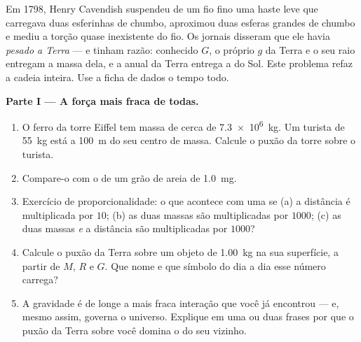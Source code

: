 \begin{problem}
\label{pb:g10:universal-gravitation:1}
Em 1798, Henry Cavendish suspendeu de um fio fino uma haste leve que
carregava duas esferinhas de chumbo, aproximou duas esferas grandes de
chumbo e mediu a torção quase inexistente do fio. Os jornais disseram que
ele havia \emph{pesado a Terra} --- e tinham razão: conhecido $G$, o
próprio $g$ da Terra e o seu raio entregam a massa dela, e a  anual
da Terra entrega a do Sol. Este problema refaz a cadeia inteira. Use a
ficha de dados o tempo todo.

\medskip
\noindent\textbf{Parte I --- A força mais fraca de todas.}
\begin{enumerate}
  \item O ferro da torre Eiffel tem massa de cerca de \qty{7.3e6}{kg}. Um
        turista de \qty{55}{kg} está a \qty{100}{m} do seu centro de
        massa. Calcule o puxão da torre sobre o turista.
  \item Compare-o com o  de um grão de areia de \qty{1.0}{mg}.
  \item Exercício de proporcionalidade: o que acontece com uma  se (a) a distância é multiplicada por $10$; (b) as
        duas massas são multiplicadas por $1000$; (c) as duas massas
        \emph{e} a distância são multiplicadas por $1000$?
  \item Calcule o puxão da Terra sobre um objeto de \qty{1.00}{kg} na sua
        superfície, a partir de $M$, $R$ e $G$. Que nome e que símbolo do
        dia a dia esse número carrega?
  \item A gravidade é de longe a mais fraca interação que você já
        encontrou --- e, mesmo assim, governa o universo. Explique em uma
        ou duas frases por que o puxão da Terra sobre você domina o do
        seu vizinho.
\end{enumerate}


\end{problem}
